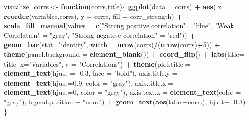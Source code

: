 \documentclass[]{article}
\newenvironment{Shaded}{\begin{snugshade}}{\end{snugshade}}
\newcommand{\ControlFlowTok}[1]{\textcolor[rgb]{0.13,0.29,0.53}{\textbf{#1}}}
\newcommand{\DataTypeTok}[1]{\textcolor[rgb]{0.13,0.29,0.53}{#1}}
\newcommand{\DecValTok}[1]{\textcolor[rgb]{0.00,0.00,0.81}{#1}}
\newcommand{\FloatTok}[1]{\textcolor[rgb]{0.00,0.00,0.81}{#1}}
\newcommand{\KeywordTok}[1]{\textcolor[rgb]{0.13,0.29,0.53}{\textbf{#1}}}
\newcommand{\NormalTok}[1]{#1}
\newcommand{\OperatorTok}[1]{\textcolor[rgb]{0.81,0.36,0.00}{\textbf{#1}}}
\newcommand{\StringTok}[1]{\textcolor[rgb]{0.31,0.60,0.02}{#1}}
\begin{document}
\begin{Shaded}
\begin{Highlighting}[]
\NormalTok{visualize_corrs <-}\StringTok{ }\ControlFlowTok{function}\NormalTok{(corrs,title)\{}
  \KeywordTok{ggplot}\NormalTok{(}\DataTypeTok{data =}\NormalTok{ corrs) }\OperatorTok{+}
\StringTok{    }\KeywordTok{aes}\NormalTok{( }\DataTypeTok{x =} \KeywordTok{reorder}\NormalTok{(variables,corrs), }\DataTypeTok{y =}\NormalTok{ corrs, }\DataTypeTok{fill =}\NormalTok{ corr_strength) }\OperatorTok{+}
\StringTok{    }\KeywordTok{scale_fill_manual}\NormalTok{(}\DataTypeTok{values =} \KeywordTok{c}\NormalTok{(}\StringTok{"Strong positive correlation"}\NormalTok{ =}\StringTok{"blue"}\NormalTok{, }\StringTok{"Weak Correlation"}\NormalTok{ =}\StringTok{ "gray"}\NormalTok{,}
                                 \StringTok{"Strong negative correlation"}\NormalTok{ =}\StringTok{ "red"}\NormalTok{)) }\OperatorTok{+}
\StringTok{    }\KeywordTok{geom_bar}\NormalTok{(}\DataTypeTok{stat=}\StringTok{"identity"}\NormalTok{, }\DataTypeTok{width =} \KeywordTok{nrow}\NormalTok{(corrs)}\OperatorTok{/}\NormalTok{(}\KeywordTok{nrow}\NormalTok{(corrs)}\OperatorTok{+}\DecValTok{5}\NormalTok{)) }\OperatorTok{+}
\StringTok{    }\KeywordTok{theme}\NormalTok{(}\DataTypeTok{panel.background =} \KeywordTok{element_blank}\NormalTok{()) }\OperatorTok{+}
\StringTok{    }\KeywordTok{coord_flip}\NormalTok{() }\OperatorTok{+}
\StringTok{    }\KeywordTok{labs}\NormalTok{(}\DataTypeTok{title=}\NormalTok{ title, }\DataTypeTok{x=}\StringTok{"Variables"}\NormalTok{, }\DataTypeTok{y =} \StringTok{"Correlations"}\NormalTok{) }\OperatorTok{+}
\StringTok{    }\KeywordTok{theme}\NormalTok{(}\DataTypeTok{plot.title =} \KeywordTok{element_text}\NormalTok{(}\DataTypeTok{hjust =} \FloatTok{-0.3}\NormalTok{, }\DataTypeTok{face =} \StringTok{"bold"}\NormalTok{), }\DataTypeTok{axis.title.y =} \KeywordTok{element_text}\NormalTok{(}\DataTypeTok{hjust=}\FloatTok{0.9}\NormalTok{, }\DataTypeTok{color =} \StringTok{"gray"}\NormalTok{), }
          \DataTypeTok{axis.title.x =} \KeywordTok{element_text}\NormalTok{(}\DataTypeTok{hjust=}\DecValTok{0}\NormalTok{, }\DataTypeTok{color =} \StringTok{"gray"}\NormalTok{), }\DataTypeTok{axis.text.x =} \KeywordTok{element_text}\NormalTok{(}\DataTypeTok{color =} \StringTok{"gray"}\NormalTok{),}
          \DataTypeTok{legend.position =} \StringTok{"none"}\NormalTok{) }\OperatorTok{+}
\StringTok{    }\KeywordTok{geom_text}\NormalTok{(}\KeywordTok{aes}\NormalTok{(}\DataTypeTok{label=}\NormalTok{corrs), }\DataTypeTok{hjust=} \FloatTok{-0.3}\NormalTok{)}
\NormalTok{\}}
\end{Highlighting}
\end{Shaded}
\end{document}
